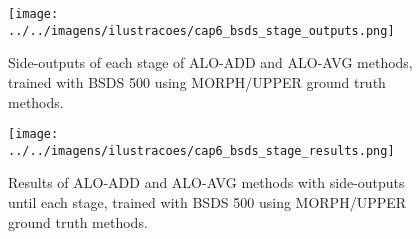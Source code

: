 

\begin{figure}%
  \centering
  \caption{Side-outputs of each stage of ALO-ADD and ALO-AVG methods, trained with BSDS 500 using MORPH/UPPER ground truth methods.}
  \texttt{[image: ../../imagens/ilustracoes/cap6\_bsds\_stage\_outputs.png]}
  \sourceOwn
  \label{fig:bsds_stage_outputs}
\end{figure}

\begin{figure}%
  \centering
  \caption{Results of ALO-ADD and ALO-AVG methods with side-outputs until each stage, trained with BSDS 500 using MORPH/UPPER ground truth methods.}
  \texttt{[image: ../../imagens/ilustracoes/cap6\_bsds\_stage\_results.png]}
  \sourceOwn
  \label{fig:bsds_stage_results}
\end{figure}


